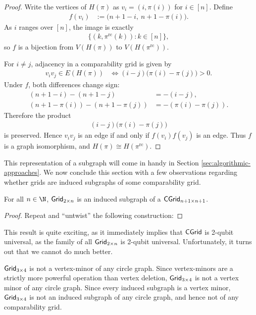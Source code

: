 \begin{proof}
Write the vertices of \(H(\pi)\) as
$v_i=(i,\pi(i))$ for $i\in[n]$.
Define
\begin{align}
    f(v_i)
    &:= \bigl(n+1-i,\ n+1-\pi(i)\bigr).
\end{align}
As \(i\) ranges over \([n]\), the image is exactly
\begin{align}
    \{(k,\pi^{\mathrm{rc}}(k)) : k\in[n]\},
\end{align}
so \(f\) is a bijection from \(V(H(\pi))\) to \(V(H(\pi^{\mathrm{rc}}))\).

For \(i\neq j\), adjacency in a comparability grid is given by
\begin{align}
    v_i v_j\in E(H(\pi))
    &\iff (i-j)\bigl(\pi(i)-\pi(j)\bigr)>0.
\end{align}
Under \(f\), both differences change sign:
\begin{align}
    (n+1-i)-(n+1-j)&=-(i-j),\\
    (n+1-\pi(i))-(n+1-\pi(j))
    &= -(\pi(i)-\pi(j)).
\end{align}
Therefore the product
\begin{align}
    (i-j)\bigl(\pi(i)-\pi(j)\bigr)
\end{align}
is preserved. Hence \(v_i v_j\) is an edge if and only if \(f(v_i)f(v_j)\)
is an edge. Thus \(f\) is a graph isomorphism, and $H(\pi)\cong H(\pi^{\mathrm{rc}})$.
\end{proof}

This representation of a subgraph will come in handy in Section \ref{sec:algorithmic-approaches}. We now conclude this section with a few observations regarding whether grids are induced subgraphs of some comparability grid.

\begin{fact}
For all $n \in \N$, $\mathsf{Grid}_{2 \times n}$ is an induced subgraph of a $\mathsf{CGrid}_{n+1 \times n+1}$.
\end{fact}

\begin{proof}
Repeat and ``untwist'' the following construction: 
\end{proof}


This result is quite exciting, as it immediately implies that $\mathsf{CGrid}$ is 2-qubit universal, as the family of all $\mathsf{Grid}_{2 \times n}$ is 2-qubit universal. Unfortunately, it turns out that we cannot do much better.

\begin{fact}
\label{fact:grid-not-vertex-minor-cgraph}
$\mathsf{Grid}_{3 \times 4}$ is not a vertex-minor of any circle graph. Since vertex-minors are a strictly more powerful operation than vertex deletion, \(\mathsf{Grid}_{3\times4}\) is not a vertex minor of any circle graph. Since every
induced subgraph is a vertex minor, \(\mathsf{Grid}_{3\times4}\) is not an induced
subgraph of any circle graph, and hence not of any comparability grid.
\end{fact}

